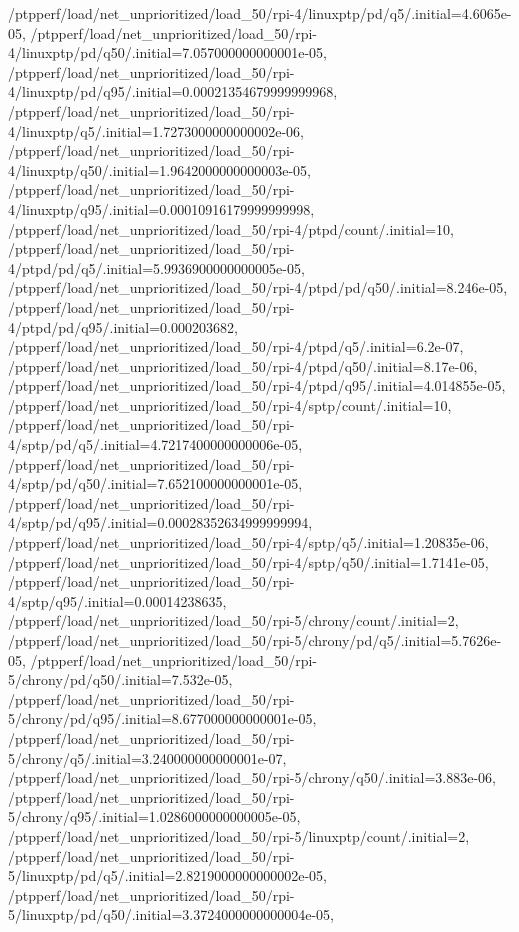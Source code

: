 {    /ptpperf/load/net_unprioritized/load_50/rpi-4/linuxptp/pd/q5/.initial=4.6065e-05,
    /ptpperf/load/net_unprioritized/load_50/rpi-4/linuxptp/pd/q50/.initial=7.057000000000001e-05,
    /ptpperf/load/net_unprioritized/load_50/rpi-4/linuxptp/pd/q95/.initial=0.00021354679999999968,
    /ptpperf/load/net_unprioritized/load_50/rpi-4/linuxptp/q5/.initial=1.7273000000000002e-06,
    /ptpperf/load/net_unprioritized/load_50/rpi-4/linuxptp/q50/.initial=1.9642000000000003e-05,
    /ptpperf/load/net_unprioritized/load_50/rpi-4/linuxptp/q95/.initial=0.00010916179999999998,
    /ptpperf/load/net_unprioritized/load_50/rpi-4/ptpd/count/.initial=10,
    /ptpperf/load/net_unprioritized/load_50/rpi-4/ptpd/pd/q5/.initial=5.9936900000000005e-05,
    /ptpperf/load/net_unprioritized/load_50/rpi-4/ptpd/pd/q50/.initial=8.246e-05,
    /ptpperf/load/net_unprioritized/load_50/rpi-4/ptpd/pd/q95/.initial=0.000203682,
    /ptpperf/load/net_unprioritized/load_50/rpi-4/ptpd/q5/.initial=6.2e-07,
    /ptpperf/load/net_unprioritized/load_50/rpi-4/ptpd/q50/.initial=8.17e-06,
    /ptpperf/load/net_unprioritized/load_50/rpi-4/ptpd/q95/.initial=4.014855e-05,
    /ptpperf/load/net_unprioritized/load_50/rpi-4/sptp/count/.initial=10,
    /ptpperf/load/net_unprioritized/load_50/rpi-4/sptp/pd/q5/.initial=4.7217400000000006e-05,
    /ptpperf/load/net_unprioritized/load_50/rpi-4/sptp/pd/q50/.initial=7.652100000000001e-05,
    /ptpperf/load/net_unprioritized/load_50/rpi-4/sptp/pd/q95/.initial=0.00028352634999999994,
    /ptpperf/load/net_unprioritized/load_50/rpi-4/sptp/q5/.initial=1.20835e-06,
    /ptpperf/load/net_unprioritized/load_50/rpi-4/sptp/q50/.initial=1.7141e-05,
    /ptpperf/load/net_unprioritized/load_50/rpi-4/sptp/q95/.initial=0.00014238635,
    /ptpperf/load/net_unprioritized/load_50/rpi-5/chrony/count/.initial=2,
    /ptpperf/load/net_unprioritized/load_50/rpi-5/chrony/pd/q5/.initial=5.7626e-05,
    /ptpperf/load/net_unprioritized/load_50/rpi-5/chrony/pd/q50/.initial=7.532e-05,
    /ptpperf/load/net_unprioritized/load_50/rpi-5/chrony/pd/q95/.initial=8.677000000000001e-05,
    /ptpperf/load/net_unprioritized/load_50/rpi-5/chrony/q5/.initial=3.240000000000001e-07,
    /ptpperf/load/net_unprioritized/load_50/rpi-5/chrony/q50/.initial=3.883e-06,
    /ptpperf/load/net_unprioritized/load_50/rpi-5/chrony/q95/.initial=1.0286000000000005e-05,
    /ptpperf/load/net_unprioritized/load_50/rpi-5/linuxptp/count/.initial=2,
    /ptpperf/load/net_unprioritized/load_50/rpi-5/linuxptp/pd/q5/.initial=2.8219000000000002e-05,
    /ptpperf/load/net_unprioritized/load_50/rpi-5/linuxptp/pd/q50/.initial=3.3724000000000004e-05,
}

